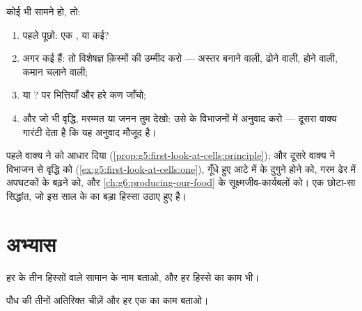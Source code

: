 \begin{method}[किसी भी जीव को कोशिका के पैमाने पर पढ़ना]\label{met:g6:cell-unit-of-life:read}
कोई भी  सामने हो, तो:
\begin{enumerate}
  \item पहले पूछो: एक , या कई?
  \item अगर कई हैं: तो विशेषज्ञ क़िस्मों की उम्मीद करो --- अस्तर बनाने
        वाली, ढोने वाली,  होने वाली, कमान चलाने वाली;
  \item {} या ?  पर भित्तियाँ और हरे कण जाँचो;
  \item और जो भी वृद्धि, मरम्मत या जनन तुम देखो: उसे  के
        विभाजनों में अनुवाद करो --- दूसरा वाक्य गारंटी देता है कि यह
        अनुवाद मौजूद है।
\end{enumerate}
\end{method}

\begin{example}[यह सिद्धांत इस पुस्तक में काम पर]\label{ex:g6:cell-unit-of-life:atwork}
पहले वाक्य ने  को आधार दिया
(\cref{prop:g5:first-look-at-cells:principle}); और दूसरे वाक्य ने
विभाजन से वृद्धि को (\cref{ex:g5:first-look-at-cells:one}), गूँधे हुए
आटे में  के दुगुने होने को, गरम ढेर में अपघटकों के बढ़ने को, और
\cref{ch:g6:producing-our-food} के सूक्ष्मजीव-कार्यबलों को। एक छोटा-सा
सिद्धांत, जो इस साल के  का बड़ा हिस्सा उठाए हुए है।
\end{example}

\section{अभ्यास}

\begin{exercise}[$\star$]\label{exo:g6:cell-unit-of-life:1}
हर  के तीन हिस्सों वाले सामान के नाम बताओ, और हर हिस्से का काम
भी।
\end{exercise}

\begin{exercise}[$\star$]\label{exo:g6:cell-unit-of-life:2}
पौध  की तीनों अतिरिक्त चीज़ें और हर एक का काम बताओ।
\end{exercise}

